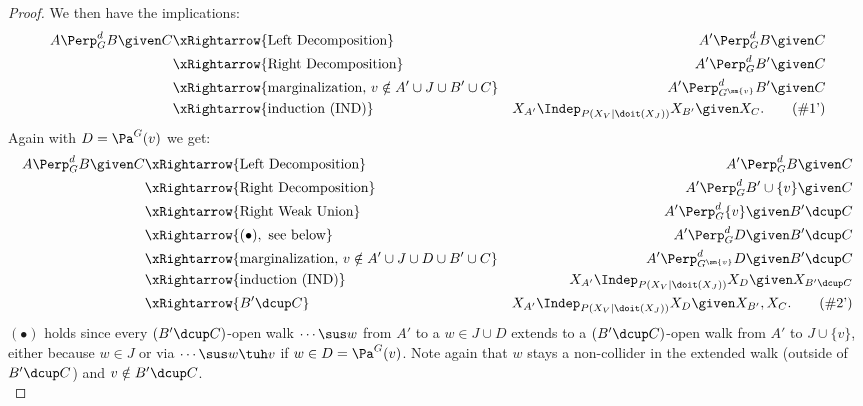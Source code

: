 \begin{Thm}
\begin{proof}
We then have the implications:
\begin{align*}
A  \Perp^d_G B \given C 
& \xRightarrow{\text{Left Decomposition}}  & A' \Perp^d_G  B \given C \\
& \xRightarrow{\text{Right Decomposition}}  & A' \Perp^d_G  B' \given C \\
 & \xRightarrow{\text{marginalization, } v \notin A'\cup J \cup B' \cup C}  & A' \Perp^d_{G^{\sm \{v\}}}  B' \given C \\
 & \xRightarrow{\text{induction (IND)}}  & X_{A'} \Indep_{P(X_V|\doit(X_J))}  X_{B'} \given X_C. \label{eqn:bli'} \tag{\#1'}
\end{align*}
Again with $D = \Pa^G(v)$ we get:
\begin{align*}
A  \Perp^d_G  B \given C  & \xRightarrow{\text{Left Decomposition}}  & A' \Perp^d_G  B \given C \\
 & \xRightarrow{\text{Right Decomposition}}  & A' \Perp^d_G  B' \cup \{v\} \given C \\
& \xRightarrow{\text{Right Weak Union}}  & A' \Perp^d_G  \{v\} \given B' \dcup C  \\
 & \xRightarrow{(\bullet), \text{ see below}}  & A'  \Perp^d_G  D \given B' \dcup C \\  
  & \xRightarrow{\text{marginalization, } v \notin A' \cup J \cup D \cup B' \cup C}  & A'  \Perp^d_{G^{\sm \{v\}}}  D \given B' \dcup C \\  
& \xRightarrow{\text{induction (IND)}}  &   X_{A'}  \Indep_{P(X_V|\doit(X_J))}  X_D \given X_{B' \dcup C}\\
& \xRightarrow{ B' \dcup C}  &   X_{A'}  \Indep_{P(X_V|\doit(X_J))}  X_D \given X_{B'}, X_C. \label{eqn:bla'} \tag{\#2'} 
\end{align*}
$(\bullet)$ holds since every $(B' \dcup C)$-open walk $\cdots \sus w$ from $A'$ to a $w \in J \cup D$ extends to 
a $(B' \dcup C)$-open walk from $A'$ to $J \cup \{v\}$, either because $w \in J$ or via $\cdots \sus w \tuh v$ if 
$w \in D=\Pa^G(v)$.
Note again that $w$ stays a non-collider in the extended walk (outside of $B'\dcup C$) and $v \notin B'\dcup C$.\\


\end{proof}
\end{Thm}
